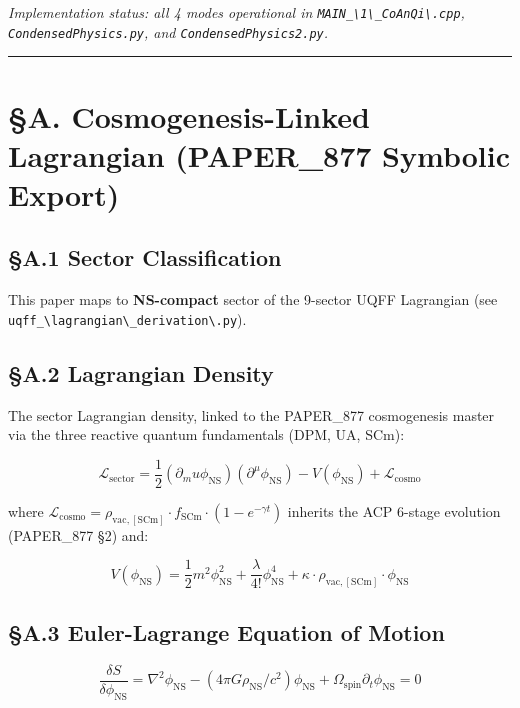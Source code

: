 \documentclass[12pt,a4paper]{article}
\begin{document}
\emph{Implementation status: all 4 modes operational in \texttt{MAIN\_\textbackslash {1\textbackslash \_CoAnQi\textbackslash }.cpp}, \texttt{CondensedPhysics.py}, and \texttt{CondensedPhysics2.py}.}

\medskip\hrule\medskip

\section{\S{}A. Cosmogenesis-Linked Lagrangian (PAPER\_877 Symbolic Export)}

\subsection{\S{}A.1 Sector Classification}

This paper maps to \textbf{NS-compact} sector of the 9-sector UQFF Lagrangian (see \texttt{uqff\_\textbackslash {lagrangian\textbackslash \_derivation\textbackslash }.py}).

\subsection{\S{}A.2 Lagrangian Density}

The sector Lagrangian density, linked to the PAPER\_877 cosmogenesis master via the three reactive quantum fundamentals (DPM, UA, SCm):

\begin{equation}
\mathcal{L}_{\mathrm{sector}} = \frac{1}{2}(\partial_mu \phi_{\mathrm{NS}})(\partial^\mu \phi_{\mathrm{NS}}) - V(\phi_{\mathrm{NS}}) + \mathcal{L}_{\mathrm{cosmo}}
\end{equation}

where $\mathcal{L}_{\mathrm{cosmo}} = \rho_{\mathrm{vac,[SCm]}} \cdot f_{\mathrm{SCm}} \cdot (1 - e^{-\gamma t})$ inherits the ACP 6-stage evolution (PAPER\_877 \S{}2) and:

\begin{equation}
V(\phi_{\mathrm{NS}}) = \frac{1}{2} m^2 \phi_{\mathrm{NS}}^2 + \frac{\lambda}{4!} \phi_{\mathrm{NS}}^4 + \kappa \cdot \rho_{\mathrm{vac,[SCm]}} \cdot \phi_{\mathrm{NS}}
\end{equation}

\subsection{\S{}A.3 Euler-Lagrange Equation of Motion}

\begin{equation}
\boxed{\frac{\delta S}{\delta \phi_{\mathrm{NS}}} = \nabla^2 \phi_{\mathrm{NS}} - (4\pi G \rho_{\mathrm{NS}}/c^2)\phi_{\mathrm{NS}} + \Omega_{\mathrm{spin}} \partial_t \phi_{\mathrm{NS}} = 0}
\end{equation}
\end{document}
